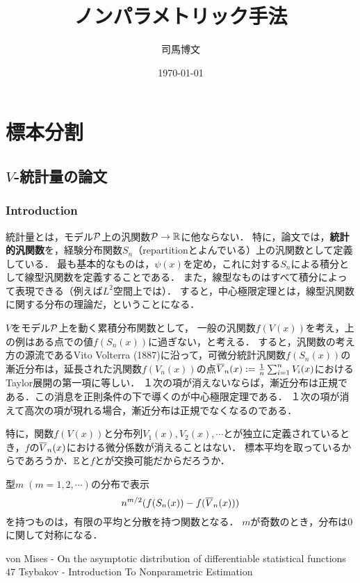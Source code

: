 \documentclass[uplatex,dvipdfmx]{jsreport}
\title{ノンパラメトリック手法}
\author{司馬博文}
\date{\today}
\begin{document}
\tableofcontents

\chapter{標本分割}

\section{$V$-統計量の論文}

\subsection{Introduction}

\begin{definition}
    統計量とは，モデル$\P$上の汎関数$\P\to\R$に他ならない．
    特に，論文\cite{von Mises}では，\textbf{統計的汎関数}を，経験分布関数$S_n$（repartitionとよんでいる）上の汎関数として定義している．
    最も基本的なものは，$\psi(x)$を定め，これに対する$S_n$による積分として線型汎関数を定義することである．
    また，線型なものはすべて積分によって表現できる（例えば$L^2$空間上では）．
    すると，中心極限定理とは，線型汎関数に関する分布の理論だ，ということになる．
\end{definition}

\begin{discussion}[動機]
    $V$をモデル$\P$上を動く累積分布関数として，
    一般の汎関数$f(V(x))$を考え，上の例はある点での値$f(S_n(x))$に過ぎない，と考える．
    すると，汎関数の考え方の源流であるVito Volterra (1887)に沿って，可微分統計汎関数$f(S_n(x))$の漸近分布は，延長された汎関数$f(V_n(x))$の点$\o{V}_n(x):=\frac{1}{n}\sum_{i=1}^nV_i(x)$におけるTaylor展開の第一項に等しい．
    １次の項が消えないならば，漸近分布は正規である．この消息を正則条件の下で導くのが中心極限定理である．
    １次の項が消えて高次の項が現れる場合，漸近分布は正規でなくなるのである．

    特に，関数$f(V(x))$と分布列$V_1(x),V_2(x),\cdots$とが独立に定義されているとき，$f$の$\o{V}_n(x)$における微分係数が消えることはない．
    標本平均を取っているからであろうか．$\bE$と$f$とが交換可能だからだろうか．
\end{discussion}

\begin{discussion}
    型$m\;(m=1,2,\cdots)$の分布で表示
    \[n^{m/2}(f(S_n(x))-f(\o{V}_n(x)))\]
    を持つものは，有限の平均と分散を持つ関数となる．
    $m$が奇数のとき，分布は$0$に関して対称になる．
\end{discussion}

\begin{thebibliography}{9}
    von Mises - On the asymptotic distribution of differentiable statistical functions 47
    Tsybakov - Introduction To Nonparametric Estimation
\end{thebibliography}
\end{document}
